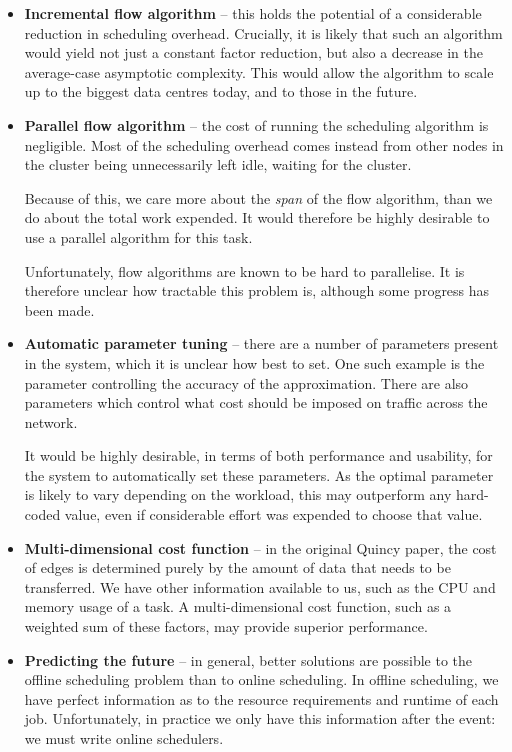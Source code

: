 \begin{itemize}
  \item \textbf{Incremental flow algorithm} -- this holds the potential of a considerable reduction in scheduling overhead. Crucially, it is likely that such an algorithm would yield not just a constant factor reduction, but also a decrease in the average-case asymptotic complexity. This would allow the algorithm to scale up to the biggest data centres today, and to those in the future.
  \item \textbf{Parallel flow algorithm} -- the cost of running the scheduling algorithm is negligible. Most of the scheduling overhead comes instead from other nodes in the cluster being unnecessarily left idle, waiting for the cluster.
    
    Because of this, we care more about the \emph{span} of the flow algorithm, than we do about the total work expended. It would therefore be highly desirable to use a parallel algorithm for this task.
    
    Unfortunately, flow algorithms are known to be hard to parallelise. It is therefore unclear how tractable this problem is, although some progress has been made.\cite{Staples:1995}
  \item \textbf{Automatic parameter tuning} -- there are a number of parameters present in the system, which it is unclear how best to set. One such example is the parameter controlling the accuracy of the approximation. There are also parameters which control what cost should be imposed on traffic across the network.

        It would be highly desirable, in terms of both performance and usability, for the system to automatically set these parameters. As the optimal parameter is likely to vary depending on the workload, this may outperform any hard-coded value, even if considerable effort was expended to choose that value.
  \item \textbf{Multi-dimensional cost function} -- in the original Quincy paper, the cost of edges is determined purely by the amount of data that needs to be transferred. We have other information available to us, such as the CPU and memory usage of a task. A multi-dimensional cost function, such as a weighted sum of these factors, may provide superior performance.
  \item \textbf{Predicting the future} -- in general, better solutions are possible to the offline scheduling problem than to online scheduling. In offline scheduling, we have perfect information as to the resource requirements and runtime of each job. Unfortunately, in practice we only have this information after the event: we must write online schedulers.


\end{itemize}
